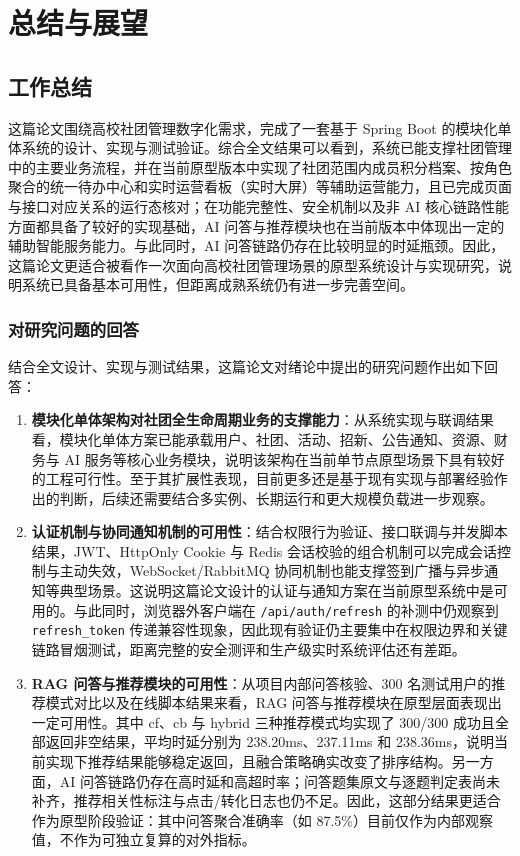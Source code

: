 ﻿%
\chapter{总结与展望}

\section{工作总结}

这篇论文围绕高校社团管理数字化需求，完成了一套基于 Spring Boot 的模块化单体系统的设计、实现与测试验证。综合全文结果可以看到，系统已能支撑社团管理中的主要业务流程，并在当前原型版本中实现了社团范围内成员积分档案、按角色聚合的统一待办中心和实时运营看板（实时大屏）等辅助运营能力，且已完成页面与接口对应关系的运行态核对；在功能完整性、安全机制以及非 AI 核心链路性能方面都具备了较好的实现基础，AI 问答与推荐模块也在当前版本中体现出一定的辅助智能服务能力。与此同时，AI 问答链路仍存在比较明显的时延瓶颈。因此，这篇论文更适合被看作一次面向高校社团管理场景的原型系统设计与实现研究，说明系统已具备基本可用性，但距离成熟系统仍有进一步完善空间。

\subsection{对研究问题的回答}

结合全文设计、实现与测试结果，这篇论文对绪论中提出的研究问题作出如下回答：

\begin{enumerate}
  \item \textbf{模块化单体架构对社团全生命周期业务的支撑能力}：从系统实现与联调结果看，模块化单体方案已能承载用户、社团、活动、招新、公告通知、资源、财务与 AI 服务等核心业务模块，说明该架构在当前单节点原型场景下具有较好的工程可行性。至于其扩展性表现，目前更多还是基于现有实现与部署经验作出的判断，后续还需要结合多实例、长期运行和更大规模负载进一步观察。
  \item \textbf{认证机制与协同通知机制的可用性}：结合权限行为验证、接口联调与并发脚本结果，JWT、HttpOnly Cookie 与 Redis 会话校验的组合机制可以完成会话控制与主动失效，WebSocket/RabbitMQ 协同机制也能支撑签到广播与异步通知等典型场景。这说明这篇论文设计的认证与通知方案在当前原型系统中是可用的。与此同时，浏览器外客户端在 \texttt{/api/auth/refresh} 的补测中仍观察到 \texttt{refresh\_token} 传递兼容性现象，因此现有验证仍主要集中在权限边界和关键链路冒烟测试，距离完整的安全测评和生产级实时系统评估还有差距。
  \item \textbf{RAG 问答与推荐模块的可用性}：从项目内部问答核验、300 名测试用户的推荐模式对比以及在线脚本结果来看，RAG 问答与推荐模块在原型层面表现出一定可用性。其中 cf、cb 与 hybrid 三种推荐模式均实现了 300/300 成功且全部返回非空结果，平均时延分别为 238.20ms、237.11ms 和 238.36ms，说明当前实现下推荐结果能够稳定返回，且融合策略确实改变了排序结构。另一方面，AI 问答链路仍存在高时延和高超时率；问答题集原文与逐题判定表尚未补齐，推荐相关性标注与点击/转化日志也仍不足。因此，这部分结果更适合作为原型阶段验证：其中问答聚合准确率（如 87.5\%）目前仅作为内部观察值，不作为可独立复算的对外指标。
\end{enumerate}

